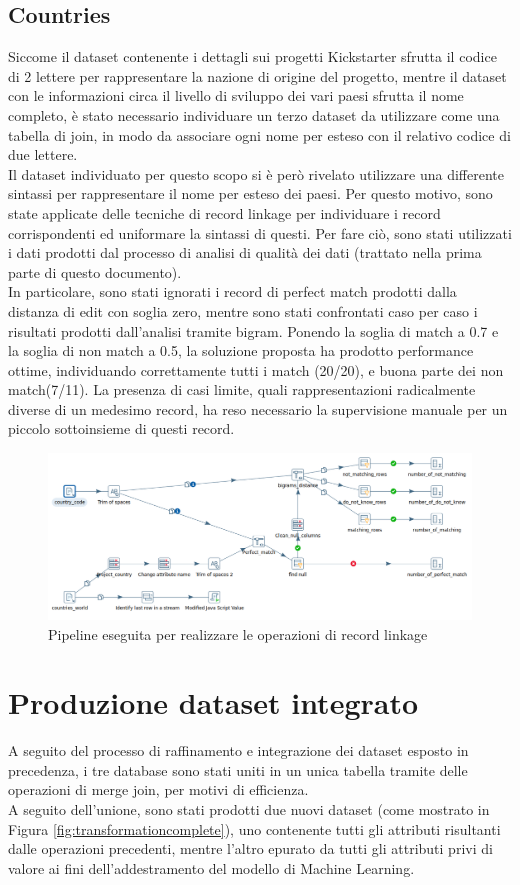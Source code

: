 \subsection{Countries}
Siccome il dataset contenente i dettagli sui progetti Kickstarter sfrutta il codice di 2 lettere per rappresentare la nazione di origine del progetto, mentre il dataset con le informazioni circa il livello di sviluppo dei vari paesi sfrutta il nome completo, è stato necessario individuare un terzo dataset da utilizzare come una tabella di join, in modo da associare ogni nome per esteso con il relativo codice di due lettere.\\
Il dataset individuato per questo scopo si è però rivelato utilizzare una differente sintassi per rappresentare il nome per esteso dei paesi. Per questo motivo, sono state applicate delle tecniche di record linkage per individuare i record corrispondenti ed uniformare la sintassi di questi. Per fare ciò, sono stati utilizzati i dati prodotti dal processo di analisi di qualità dei dati (trattato nella prima parte di questo documento).\\
In particolare, sono stati ignorati i record di perfect match prodotti dalla distanza di edit con soglia zero, mentre sono stati confrontati caso per caso i risultati prodotti dall'analisi tramite bigram. Ponendo la soglia di match a 0.7 e la soglia di non match a 0.5, la soluzione proposta ha prodotto performance ottime, individuando correttamente tutti i match (20/20), e buona parte dei non match(7/11). La presenza di casi limite, quali rappresentazioni radicalmente diverse di un medesimo record, ha reso necessario la supervisione manuale per un piccolo sottoinsieme di questi record.\\

\begin{figure}
	\centering
	\includegraphics[width=0.7\linewidth]{images/RecordLinkage}
	\caption{Pipeline eseguita per realizzare le operazioni di record linkage}
	\label{fig:recordlinkage}
\end{figure}


\section{Produzione dataset integrato}
A seguito del processo di raffinamento e integrazione dei dataset esposto in precedenza, i tre database sono stati uniti in un unica tabella tramite delle operazioni di merge join, per motivi di efficienza.\\
A seguito dell'unione, sono stati prodotti due nuovi dataset (come mostrato in Figura \ref{fig:transformationcomplete}), uno contenente tutti gli attributi risultanti dalle operazioni precedenti, mentre l'altro epurato da tutti gli attributi privi di valore ai fini dell'addestramento del modello di Machine Learning.

